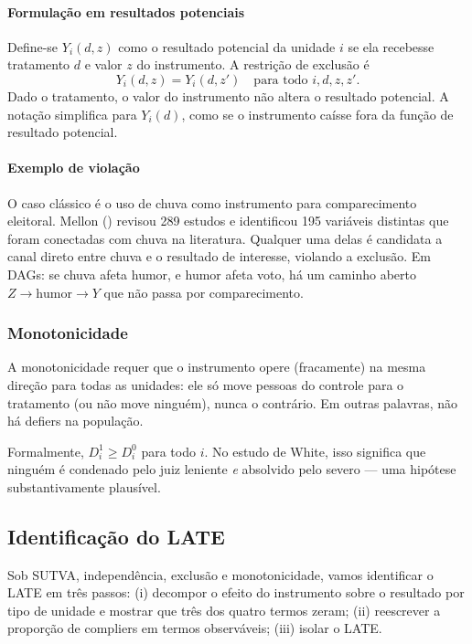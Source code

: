 \documentclass[
]{article}
\begin{document}
\paragraph{Formulação em resultados potenciais}\label{formulauxe7uxe3o-em-resultados-potenciais}

Define-se \(Y_i(d, z)\) como o resultado potencial da unidade \(i\) se ela recebesse tratamento \(d\) e valor \(z\) do instrumento. A restrição de exclusão é
\[Y_i(d, z) = Y_i(d, z') \quad \text{para todo } i, d, z, z'.\]
Dado o tratamento, o valor do instrumento não altera o resultado potencial. A notação simplifica para \(Y_i(d)\), como se o instrumento caísse fora da função de resultado potencial.

\paragraph{Exemplo de violação}\label{exemplo-de-violauxe7uxe3o}

O caso clássico é o uso de chuva como instrumento para comparecimento eleitoral. Mellon () revisou 289 estudos e identificou 195 variáveis distintas que foram conectadas com chuva na literatura. Qualquer uma delas é candidata a canal direto entre chuva e o resultado de interesse, violando a exclusão. Em DAGs: se chuva afeta humor, e humor afeta voto, há um caminho aberto \(Z \to \text{humor} \to Y\) que não passa por comparecimento.

\subsubsection{Monotonicidade}\label{monotonicidade}

A monotonicidade requer que o instrumento opere (fracamente) na mesma direção para todas as unidades: ele só move pessoas do controle para o tratamento (ou não move ninguém), nunca o contrário. Em outras palavras, não há defiers na população.

Formalmente, \(D^1_i \geq D^0_i\) para todo \(i\). No estudo de White, isso significa que ninguém é condenado pelo juiz leniente \emph{e} absolvido pelo severo --- uma hipótese substantivamente plausível.

\subsection{Identificação do LATE}\label{identificauxe7uxe3o-do-late}

Sob SUTVA, independência, exclusão e monotonicidade, vamos identificar o LATE em três passos: (i) decompor o efeito do instrumento sobre o resultado por tipo de unidade e mostrar que três dos quatro termos zeram; (ii) reescrever a proporção de compliers em termos observáveis; (iii) isolar o LATE.
\end{document}

